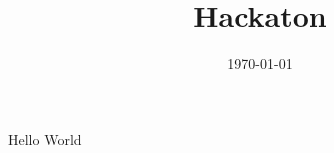 \documentclass[a4paper]{article}
\title{Hackaton}
\date{\today}
\begin{document}
    \maketitle
    \tableofcontents
    \paragraph{}
    Hello World
\end{document}

